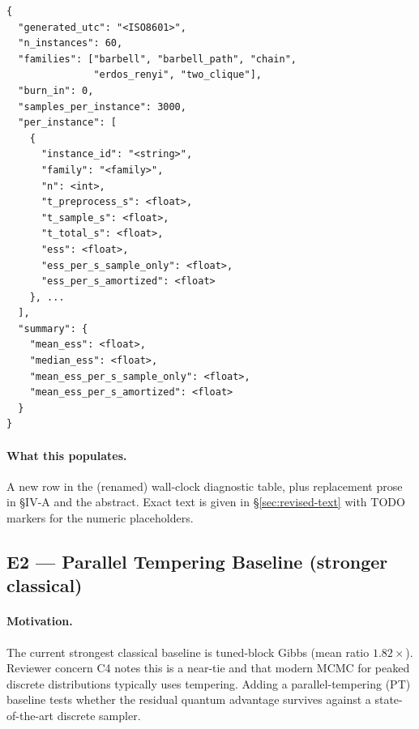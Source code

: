 \begin{verbatim}
{
  "generated_utc": "<ISO8601>",
  "n_instances": 60,
  "families": ["barbell", "barbell_path", "chain",
               "erdos_renyi", "two_clique"],
  "burn_in": 0,
  "samples_per_instance": 3000,
  "per_instance": [
    {
      "instance_id": "<string>",
      "family": "<family>",
      "n": <int>,
      "t_preprocess_s": <float>,
      "t_sample_s": <float>,
      "t_total_s": <float>,
      "ess": <float>,
      "ess_per_s_sample_only": <float>,
      "ess_per_s_amortized": <float>
    }, ...
  ],
  "summary": {
    "mean_ess": <float>,
    "median_ess": <float>,
    "mean_ess_per_s_sample_only": <float>,
    "mean_ess_per_s_amortized": <float>
  }
}
\end{verbatim}

\paragraph{What this populates.}  A new row in the (renamed) wall-clock
diagnostic table, plus replacement prose in \S IV-A and the abstract.
Exact text is given in \S\ref{sec:revised-text} with TODO markers for the
numeric placeholders.

\subsection{E2 --- Parallel Tempering Baseline (stronger classical)}

\paragraph{Motivation.}  The current strongest classical baseline is
tuned-block Gibbs (mean ratio $1.82\times$).  Reviewer concern C4 notes this
is a near-tie and that modern MCMC for peaked discrete distributions
typically uses tempering.  Adding a parallel-tempering (PT) baseline tests
whether the residual quantum advantage survives against a state-of-the-art
discrete sampler.

